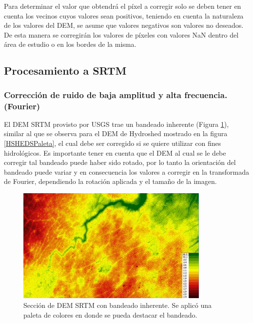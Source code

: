 \documentclass[10pt,a4paper, twoside]{report}
\begin{document}
Para determinar el valor que obtendrá el píxel a corregir solo se deben tener en cuenta los vecinos cuyos valores sean positivos, teniendo en cuenta la naturaleza de los valores del DEM, se asume que valores negativos son valores no deseados. De esta manera se corregirán los valores de píxeles con valores NaN dentro del área de estudio o en los bordes de la misma.


\subsection{Procesamiento a SRTM}

\subsubsection{Corrección de ruido de baja amplitud y alta frecuencia. (Fourier)}
\label{correccionfourier}



El DEM SRTM provisto por USGS trae un bandeado inherente (Figura \ref{SinFourier}), similar al que se observa para el DEM de Hydroshed mostrado en la figura \ref{HSHEDSPaleta}, el cual debe ser corregido si se quiere utilizar con fines hidrológicos. Es importante tener en cuenta que el DEM al cual se le debe corregir tal bandeado puede haber sido rotado, por lo tanto la orientación del bandeado puede variar y en consecuencia los valores a corregir en la transformada de Fourier, dependiendo la rotación aplicada y el tamaño de la imagen.

\begin{figure}[!htb]
   \centering      
   \includegraphics[width=0.85\textwidth]{imagenes/SRTMSinFourier.jpg}
 \caption{Sección de DEM SRTM con bandeado inherente. Se aplicó una paleta de colores en donde se pueda destacar el bandeado.}
 \label{SinFourier}
\end{figure}
\end{document}
